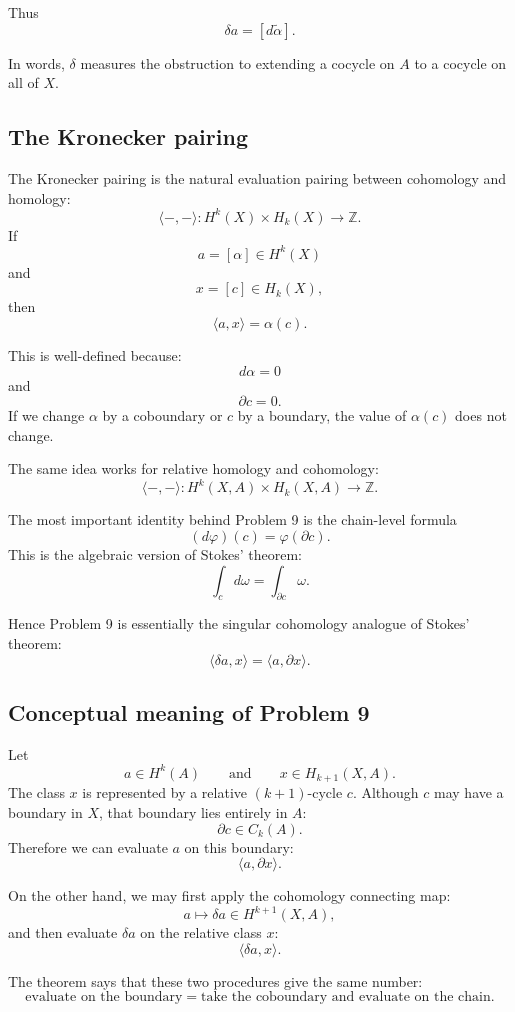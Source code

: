 \documentclass[12pt,a4paper]{article}
\theoremstyle{notespace}
\begin{document}
Thus
\[
\boxed{
	\delta a=[d\widetilde{\alpha}].
}
\]

In words, \(\delta\) measures the obstruction to extending a cocycle on \(A\) to a cocycle on all of \(X\).

\subsection{The Kronecker pairing}

The Kronecker pairing is the natural evaluation pairing between cohomology and homology:
\[
\langle -,-\rangle:
H^k(X)\times H_k(X)
\longrightarrow
\mathbb Z.
\]
If
\[
a=[\alpha]\in H^k(X)
\]
and
\[
x=[c]\in H_k(X),
\]
then
\[
\langle a,x\rangle=\alpha(c).
\]

This is well-defined because:
\[
d\alpha=0
\]
and
\[
\partial c=0.
\]
If we change \(\alpha\) by a coboundary or \(c\) by a boundary, the value of \(\alpha(c)\) does not change.

The same idea works for relative homology and cohomology:
\[
\langle -,-\rangle:
H^k(X,A)\times H_k(X,A)
\longrightarrow
\mathbb Z.
\]

The most important identity behind Problem 9 is the chain-level formula
\[
(d\varphi)(c)=\varphi(\partial c).
\]
This is the algebraic version of Stokes' theorem:
\[
\int_c d\omega=\int_{\partial c}\omega.
\]

Hence Problem 9 is essentially the singular cohomology analogue of Stokes' theorem:
\[
\boxed{
	\langle \delta a,x\rangle=\langle a,\partial x\rangle.
}
\]

\subsection{Conceptual meaning of Problem 9}

Let
\[
a\in H^k(A)
\qquad\text{and}\qquad
x\in H_{k+1}(X,A).
\]
The class \(x\) is represented by a relative \((k+1)\)-cycle \(c\). Although \(c\) may have a boundary in \(X\), that boundary lies entirely in \(A\):
\[
\partial c\in C_k(A).
\]
Therefore we can evaluate \(a\) on this boundary:
\[
\langle a,\partial x\rangle.
\]

On the other hand, we may first apply the cohomology connecting map:
\[
a\mapsto \delta a\in H^{k+1}(X,A),
\]
and then evaluate \(\delta a\) on the relative class \(x\):
\[
\langle \delta a,x\rangle.
\]

The theorem says that these two procedures give the same number:
\[
\boxed{
	\text{evaluate on the boundary}
	=
	\text{take the coboundary and evaluate on the chain}.
}
\]
\end{document}
